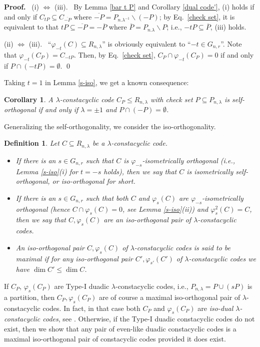 \documentclass{article}
\newtheorem{Definition}[Theorem]{Definition}
\newtheorem{Corollary}[Theorem]{Corollary}
\numberwithin{equation}{section}
\numberwithin{table}{section}
\def\pf{\par{\bf Proof.}~ }
\def\M{{\varphi}} \def\N{{\psi}} \def\m{{\mu}}
\begin{document}
\pf (i) $\Leftrightarrow$ (iii).~
By Lemma \ref{bar t P} and Corollary \ref{dual code'},
(i) holds if and only if $C_{tP}\subseteq C_{\overline{-P}}$
where $\overline{-P}=P_{n.\lambda^{-1}}\backslash(-P)$;
by Eq.~\eqref{check set},
it is equivalent to that $tP\subseteq \overline{-P}=-\overline P$
where $\overline{P}=P_{n.\lambda}\backslash P$;
i.e., $-tP\subseteq \overline P$, (iii) holds.

(ii) $\Leftrightarrow$ (iii).~
``$\M_{-t}(C)\subseteq R_{n,\lambda}$'' is obviously equivalent to
``$-t\in G_{n,r}$''.
Note that $\M_{-t}(C_P)=C_{-tP}$. Then, by Eq.~\eqref{check set},
$C_P\cap\M_{-t}(C_P)=0$ if and only if $P\cap (-tP)=\emptyset$.
\qed



\medskip
Taking $t=1$ in Lemma \ref{s-iso}, we get a known consequence:

\begin{Corollary}
A $\lambda$-constacyclic code $C_P\le R_{n,\lambda}$ with check set
$P\subseteq P_{n,\lambda}$ is self-orthogonal if and only if
$\lambda=\pm1$ and $P\cap(-P)=\emptyset$.
\end{Corollary}

Generalizing the self-orthogonality, 
we consider the iso-orthogonality.

\begin{Definition}\label{def-iso-orthog}\rm
Let $C\subseteq R_{n,\lambda}$ be a $\lambda$-constacyclic code.
\begin{itemize}
\item[(i)]
If there is an $s\in G_{n,r}$ such that
$C$ is $\M_{-s}$-isometrically orthogonal (i.e., Lemma \ref{s-iso}(i) for $t=-s$ holds),
then we say that $C$ is
{\em isometrically self-orthogonal}, or {\em iso-orthogonal} for short.
\item[(ii)]
If there is an $s\in G_{n,r}$ such that both $C$ and $\M_s(C)$
are $\M_{-s}$-isometrically orthogonal
(hence $C\cap\M_s(C)=0$, see Lemma \ref{s-iso}(ii))
and $\M_s^2(C)=C$, then we say that $C,\M_s(C)$ are an
{\em iso-orthogonal pair} of $\lambda$-constacyclic codes.
\item[(iii)]
An iso-orthogonal pair $C,\M_s(C)$ of $\lambda$-constacyclic codes
is said to be {\em maximal} if for any
iso-orthogonal pair $C',\M_{s'}(C')$ of $\lambda$-constacyclic codes
we have $\dim C'\le\dim C$.
\end{itemize}
\end{Definition}

If $C_P$, $\M_s(C_P)$ are Type-I duadic $\lambda$-constacyclic codes, i.e.,
$P_{n,\lambda}=P\cup(sP)$ is a partition, %
then $C_P,\M_s(C_P)$ are of course a maximal iso-orthogonal pair
of $\lambda$-constacyclic codes. In fact, in that case
both $C_P$ and $\M_s(C_P)$ are {\em iso-dual $\lambda$-constacyclic codes},
see \cite{Bl13}. Otherwise, if the Type-I duadic constacyclic codes do not exist,
then we show that any pair of even-like duadic constacyclic codes is a
maximal iso-orthogonal pair of constacyclic codes provided it does exist.
\end{document}
